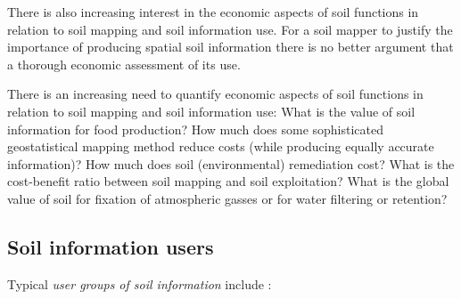 \documentclass[11pt]{krantz}
\makeatletter
\newenvironment{kframe}{%
\medskip{}
\setlength{\fboxsep}{.8em}
 \def\at@end@of@kframe{}%
 \ifinner\ifhmode%
  \def\at@end@of@kframe{\end{minipage}}%
  \begin{minipage}{\columnwidth}%
 \fi\fi%
 \def\FrameCommand##1{\hskip\@totalleftmargin \hskip-\fboxsep
 \colorbox{shadecolor}{##1}\hskip-\fboxsep
     \hskip-\linewidth \hskip-\@totalleftmargin \hskip\columnwidth}%
 \MakeFramed {\advance\hsize-\width
   \@totalleftmargin\z@ \linewidth\hsize
   \@setminipage}}%
 {\par\unskip\endMakeFramed%
 \at@end@of@kframe}
\newenvironment{rmdblock}[1]
  {
  \begin{itemize}
  \renewcommand{\labelitemi}{
    \raisebox{-.7\height}[0pt][0pt]{
      {\setkeys{Gin}{width=3em,keepaspectratio}\texttt{[image: images/\#1]}}
    }
  }
  \setlength{\fboxsep}{1em}
  \begin{kframe}
  \item
  }
  {
  \end{kframe}
  \end{itemize}
  }
\newenvironment{rmdnote}
  {\begin{rmdblock}{note}}
  {\end{rmdblock}}
\theoremstyle{definition}
\theoremstyle{definition}
\theoremstyle{definition}
\theoremstyle{remark}
\makeatother
\begin{document}
There is also increasing interest in the economic aspects of soil
functions in relation to soil mapping and soil information use. For a
soil mapper to justify the importance of producing spatial soil
information there is no better argument that a thorough economic
assessment of its use.

\begin{rmdnote}
There is an increasing need to quantify economic aspects of soil
functions in relation to soil mapping and soil information use: What is
the value of soil information for food production? How much does some
sophisticated geostatistical mapping method reduce costs (while
producing equally accurate information)? How much does soil
(environmental) remediation cost? What is the cost-benefit ratio between
soil mapping and soil exploitation? What is the global value of soil for
fixation of atmospheric gasses or for water filtering or retention?
\end{rmdnote}

\hypertarget{soil-information-users}{%
\subsection{Soil information users}\label{soil-information-users}}

Typical \emph{user groups of soil information} include
\citep{SSDS1993, harpstead2001soil}:
\end{document}
